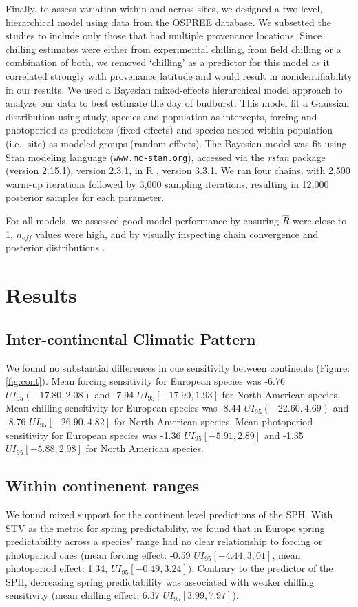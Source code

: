 \documentclass[12pt]{article}
\begin{document}
Finally, to assess variation within and across sites, we designed a two-level, hierarchical model using data from the OSPREE database. We subsetted the studies to include only those that had multiple provenance locations. Since chilling estimates were either from experimental chilling, from field chilling or a combination of both, we removed `chilling' as a predictor for this model as it correlated strongly with provenance latitude and would result in nonidentifiability in our results. We used a Bayesian mixed-effects hierarchical model approach to analyze our data to best estimate the day of budburst. This model fit a Gaussian distribution using study, species and population as intercepts, forcing and photoperiod as predictors (fixed effects) and species nested within population (i.e., site) as modeled groups (random effects). The Bayesian model was fit using Stan modeling language \citep{Carpenter2017}(\texttt{www.mc-stan.org}), accessed via the \textit{rstan} package (version 2.15.1), version 2.3.1, in R \citep{R}, version 3.3.1. We ran four chains, with 2,500 warm-up iterations followed by 3,000 sampling iterations, resulting in 12,000 posterior samples for each parameter.

For all models, we assessed good model performance by ensuring $\hat{R}$ were close to 1, $n_{eff}$ values were high, and by visually inspecting chain convergence and posterior distributions \citep{Gelman2007}. 
  
\section*{Results}
\subsection*{Inter-continental Climatic Pattern}
We found no substantial differences in cue sensitivity between continents (Figure: \ref{fig:cont}). Mean forcing sensitivity for European species was -6.76 $UI_{95}(-17.80,2.08)$  and -7.94 $UI_{95}[-17.90,1.93]$ for North American species. Mean chilling sensitivity for European species was -8.44 $UI_{95}(-22.60,4.69)$ and -8.76 $UI_{95}[-26.90,4.82]$ for North American species. Mean photoperiod sensitivity for European species was -1.36 $UI_{95}[-5.91,2.89]$ and -1.35 $UI_{95}[-5.88,2.98]$ for North American species.


\subsection*{Within continenent ranges}
We found mixed support for the continent level predictions of the SPH. With STV as the metric for spring predictability, we found that in Europe spring predictability across a species' range had no clear relationship to forcing or photoperiod cues (mean forcing effect: -0.59 $UI_{95}[-4.44,3,01]$, mean photoperiod effect: 1.34, $UI_{95}[-0.49, 3.24]$). Contrary to the predictor of the SPH, decreasing spring predictability was associated with weaker chilling sensitivity (mean chilling effect: 6.37 $UI_{95}[3.99, 7.97]$). 
\end{document}
